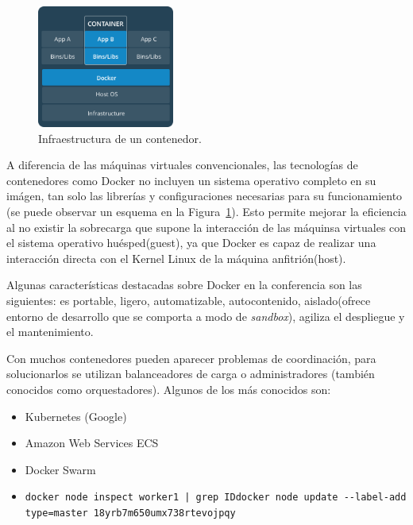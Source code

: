 \begin{figure}
\centering
\includegraphics[width=0.4\textwidth]{container.png}
\caption{\label{fig:cont}Infraestructura de un contenedor.}
\end{figure}

A diferencia de las máquinas virtuales convencionales, las tecnologías de contenedores como Docker no incluyen un sistema operativo completo en su imágen, tan solo las librerías y configuraciones necesarias para su funcionamiento (se puede observar un esquema en la Figura~\ref{fig:cont}). Esto permite mejorar la eficiencia al no existir la sobrecarga que supone la interacción de las máquinsa virtuales con el sistema operativo huésped(guest), ya que Docker es capaz de realizar una interacción directa con el Kernel Linux de la máquina anfitrión(host).

Algunas características destacadas sobre Docker en la conferencia son las siguientes: es portable, ligero, automatizable, autocontenido, aislado(ofrece entorno de desarrollo que se comporta a modo de \textit{sandbox}), agiliza el despliegue y el mantenimiento.

Con muchos contenedores pueden aparecer problemas de coordinación, para solucionarlos se utilizan balanceadores de carga o administradores (también conocidos como orquestadores). Algunos de los más conocidos son:
\begin{itemize}
\item Kubernetes (Google)
\item Amazon Web Services ECS
\item Docker Swarm
\end{itemize}

\begin{itemize}[label=\textdollar]
\item \begin{lstlisting}
docker node inspect worker1 | grep IDdocker node update --label-add type=master 18yrb7m650umx738rtevojpqy
\end{lstlisting}
\end{itemize}



